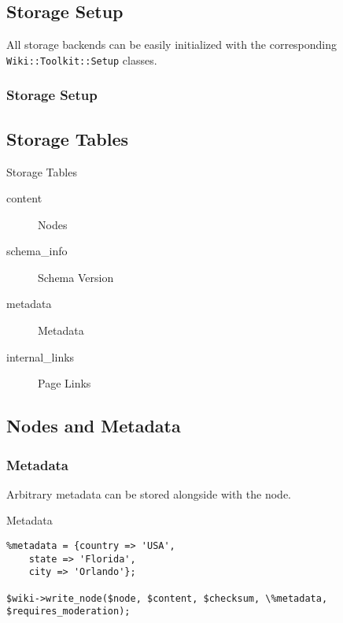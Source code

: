\subsection{Storage Setup}


All storage backends can be easily initialized with the corresponding
\verb+Wiki::Toolkit::Setup+ classes.

\begin{frame}[fragile]
\frametitle{Storage Setup}

\end{frame}

\subsection{Storage Tables}

\begin{frame}{Storage Tables}
 \begin{description}
  \item [content] Nodes
  \item [schema\_info] Schema Version
  \item [metadata] Metadata
  \item [internal\_links] Page Links
 \end{description}
\end{frame}

\subsection{Nodes and Metadata}

\subsubsection{Metadata}


Arbitrary metadata can be stored alongside with the node.

\begin{frame}[fragile]{Metadata}

\begin{lstlisting}
%metadata = {country => 'USA', 
    state => 'Florida',
    city => 'Orlando'};

$wiki->write_node($node, $content, $checksum, \%metadata, $requires_moderation);
\end{lstlisting}
\end{frame}


